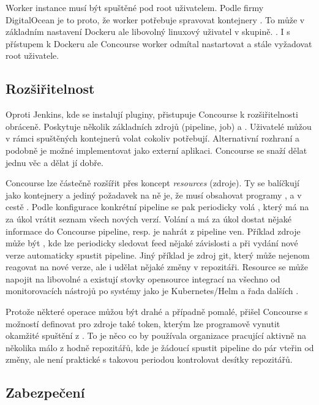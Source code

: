         Worker instance musí být spuštěné pod root uživatelem. Podle firmy DigitalOcean je to proto, že worker potřebuje spravovat kontejnery . To může v základním nastavení Dockeru ale libovolný linuxový uživatel v  skupině. . I s přístupem k Dockeru ale Concourse worker odmítal nastartovat a stále vyžadovat root uživatele.

    \subsection{Rozšiřitelnost}
        Oproti Jenkins, kde se instalují pluginy, přistupuje Concourse k rozšiřitelnosti obráceně. Poskytuje několik základních zdrojů (pipeline, job) a . Uživatelé můžou v rámci spuštěných kontejnerů volat cokoliv potřebují. Alternativní rozhraní a podobně je možné implementovat jako externí aplikaci. Concourse se snaží dělat jednu věc a dělat jí dobře.

        Concourse lze částečně rozšířit přes koncept \textit{resources} (zdroje). Ty se balíčkují jako kontejnery a jediný požadavek na ně je, že musí obsahovat programy ,  a  v cestě  \cite{concourse-resource}. Podle konfigurace konkrétní pipeline se pak periodicky volá , který má na za úkol vrátit seznam všech nových verzí. Volání  a  má za úkol dostat nějaké informace do Concourse pipeline, resp. je nahrát z pipeline ven. Příklad zdroje může být , kde lze periodicky sledovat feed nějaké závislosti a při vydání nové verze automaticky spustit pipeline. Jiný příklad je zdroj git, který může nejenom reagovat na nové verze, ale i udělat nějaké změny v repozitáři. Resource se může napojit na libovolné  a existují stovky opensource integrací na všechno od monitorovacích nástrojů po \CD systémy jako je Kubernetes/Helm a řada dalších \cite{concourse-resource-list}.

        Protože některé  operace můžou být drahé a případně pomalé, přišel Concourse s možností definovat pro zdroje také token, kterým lze programově vynutit okamžité spuštění  z . To je něco co by používala organizace pracující aktivně na několika málo z hodně repozitářů, kde je žádoucí spustit pipeline do pár vteřin od změny, ale není praktické s takovou periodou kontrolovat desítky repozitářů.

    \subsection{Zabezpečení}
        \label{subsec:concourse-security}
        \blind[1]
        \blind[2]

